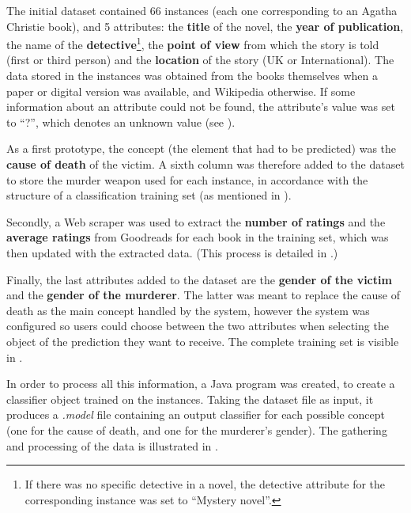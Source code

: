 \documentclass{mproj}
\begin{document}
The initial dataset contained 66 instances (each one corresponding to an Agatha Christie book), and 5 attributes: the \textbf{title} of the novel, the \textbf{year of publication}, the name of the \textbf{detective}\footnote{If there was no specific detective in a novel, the detective attribute for the corresponding instance was set to ``Mystery novel''.}, the \textbf{point of view} from which the story is told (first or third person) and the \textbf{location} of the story (UK or International). The data stored in the instances was obtained from the books themselves when a paper or digital version was available, and Wikipedia otherwise. \cite{wikipedia} If some information about an attribute could not be found, the attribute's value was set to ``?'', which denotes an unknown value (see ).\par

As a first prototype, the concept (the element that had to be predicted) was the \textbf{cause of death} of the victim. A sixth column was therefore added to the dataset to store the murder weapon used for each instance, in accordance with the structure of a classification training set (as mentioned in ).\par

Secondly, a Web scraper was used to extract the \textbf{number of ratings} and the \textbf{average ratings} from Goodreads \cite{goodreads} for each book in the training set, which was then updated with the extracted data. (This process is detailed in .)\par

Finally, the last attributes added to the dataset are the \textbf{gender of the victim} and the \textbf{gender of the murderer}. The latter was meant to replace the cause of death as the main concept handled by the system, however the system was configured so users could choose between the two attributes when selecting the object of the prediction they want to receive. The complete training set is visible in .\par

In order to process all this information, a Java program was created, to create a classifier object trained on the instances. Taking the dataset file as input, it produces a \textit{.model} file containing an output classifier for each possible concept (one for the cause of death, and one for the murderer's gender). The gathering and processing of the data is illustrated in .
\end{document}
